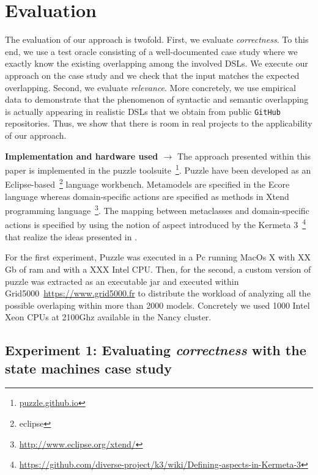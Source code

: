 \section{Evaluation}
\label{sec:validation}

The evaluation of our approach is twofold. First, we evaluate \textit{correctness}. To this end, we use a test oracle consisting of a well-documented case study where we exactly know the existing overlapping among the involved DSLs. We execute our approach on the case study and we check that the input matches the expected overlapping. Second, we evaluate \textit{relevance}. More concretely, we use empirical data to demonstrate that the phenomenon of syntactic and semantic overlapping is actually appearing in realistic DSLs that we obtain from public \texttt{GitHub} repositories. Thus, we show that there is room in real projects to the applicability of our approach.  

\textbf{Implementation and hardware used $\rightarrow$} The approach presented within this paper is implemented in the puzzle toolsuite~\footnote{\url{puzzle.github.io}}. Puzzle have been developed as an Eclipse-based~\footnote{eclipse} language workbench. Metamodels are specified in the Ecore language whereas domain-specific actions are specified as methods in Xtend programming language~\footnote{\url{http://www.eclipse.org/xtend/}}. The mapping between metaclasses and domain-specific actions is specified by using the notion of aspect introduced by the Kermeta 3~\footnote{\url{https://github.com/diverse-project/k3/wiki/Defining-aspects-in-Kermeta-3}} that realize the ideas presented in \cite{}. 

For the first experiment, Puzzle was executed in a Pc running MacOs X with XX Gb of ram and with a XXX Intel CPU. Then, for the second, a custom version of puzzle was extracted as an executable jar and executed within Grid5000~\url{https://www.grid5000.fr} to distribute the workload of analyzing all the possible overlaping within more than 2000 models. Concretely we used 1000 Intel Xeon CPUs at 2100Ghz available in the Nancy cluster.  

\subsection{Experiment 1: Evaluating \textit{correctness} with the state machines case study}

